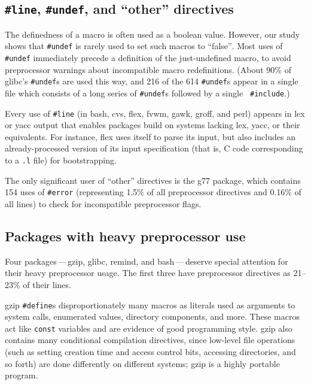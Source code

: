 \documentclass[11pt]{article}
\newcommand{\pkg}[1]{\textsf{#1}}
\begin{document}
\subsection{{\tt \#line}, {\tt \#undef}, and ``other'' directives}

The definedness of a macro is often used as a boolean value.  However, our
study shows that {\tt \#undef} is rarely used to set such macros to
``false''$\!$.  Most uses of {\tt \#undef} immediately precede a definition of
the just-undefined macro, to avoid preprocessor warnings about incompatible
macro redefinitions.  (About 90\% of \pkg{glibc}'s {\tt \#undef}s are used this
way, and 216 of the 614 {\tt \#undef}s appear in a single file which
consists of a long series of {\tt \#undef}s followed by a single {\tt
\#include}.)

Every use of {\tt \#line} (in \pkg{bash}, cvs, \pkg{flex}, \pkg{fvwm},
\pkg{gawk}, \pkg{groff}, and \pkg{perl}) appears in lex or yacc output
that enables packages build on systems lacking lex, yacc, or their
equivalents.  For instance, \pkg{flex} uses itself to parse its input,
but also includes an already-processed version of its input
specification (that is, C code corresponding to a {\tt .l} file) for
bootstrapping.

The only significant user of ``other'' directives is the \pkg{g77} package, which
contains 154 uses of {\tt \#error} (representing 1.5\% of all preprocessor
directives and 0.16\% of all lines) to check for incompatible preprocessor
flags.


\subsection{Packages with heavy preprocessor use}

Four packages\,---\,\pkg{gzip}, \pkg{glibc}, \pkg{remind}, and \pkg{bash}\,---\,deserve special
attention for their heavy preprocessor usage.  The first three have
preprocessor directives as 21--23\% of their lines.

\pkg{gzip} {\tt \#define}s disproportionately many macros as literals used as
arguments to system calls, enumerated values, directory components, and
more.  These macros act like {\tt const} variables and are evidence of good
programming style.  \pkg{gzip} also contains many conditional compilation
directives, since low-level file operations (such as setting creation time
and access control bits, accessing directories, and so forth) are done
differently on different systems; \pkg{gzip} is a highly portable program.
\end{document}
